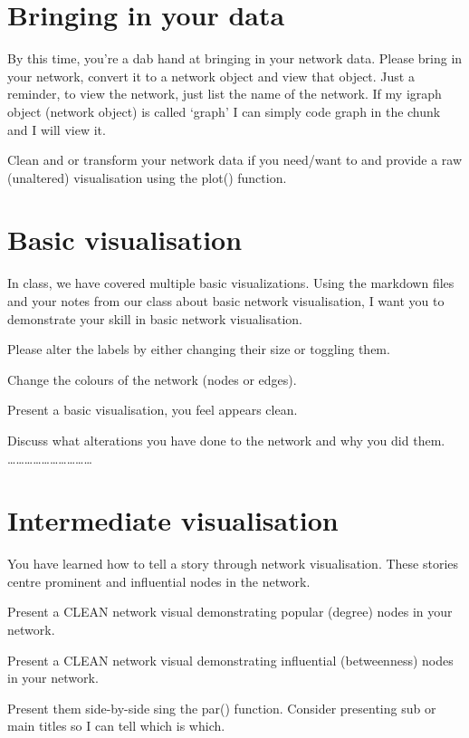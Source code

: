 \documentclass[
  letterpaper,
  DIV=11,
  numbers=noendperiod]{scrreprt}
\begin{document}
\section{Bringing in your data}\label{bringing-in-your-data}

By this time, you're a dab hand at bringing in your network data. Please
bring in your network, convert it to a network object and view that
object. Just a reminder, to view the network, just list the name of the
network. If my igraph object (network object) is called `graph' I can
simply code graph in the chunk and I will view it.

Clean and or transform your network data if you need/want to and provide
a raw (unaltered) visualisation using the plot() function.

\section{Basic visualisation}\label{basic-visualisation}

In class, we have covered multiple basic visualizations. Using the
markdown files and your notes from our class about basic network
visualisation, I want you to demonstrate your skill in basic network
visualisation.

Please alter the labels by either changing their size or toggling them.

Change the colours of the network (nodes or edges).

Present a basic visualisation, you feel appears clean.

Discuss what alterations you have done to the network and why you did
them. \ldots\ldots\ldots\ldots\ldots\ldots\ldots\ldots\ldots\ldots{}

\section{Intermediate visualisation}\label{intermediate-visualisation}

You have learned how to tell a story through network visualisation.
These stories centre prominent and influential nodes in the network.

Present a CLEAN network visual demonstrating popular (degree) nodes in
your network.

Present a CLEAN network visual demonstrating influential (betweenness)
nodes in your network.

Present them side-by-side sing the par() function. Consider presenting
sub or main titles so I can tell which is which.
\end{document}
